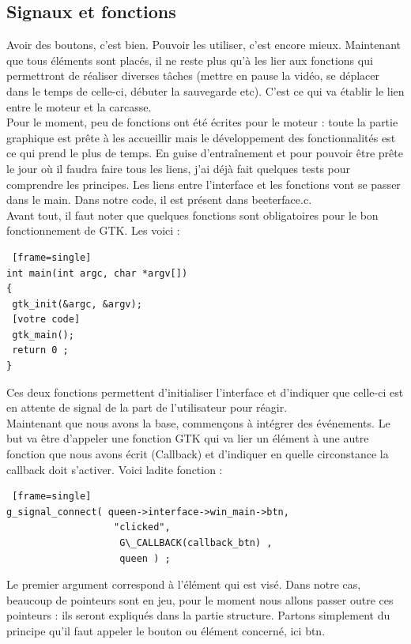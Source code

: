 \documentclass[11pt,french,a4paper]{report}
\begin{document}
        \subsection{Signaux et fonctions} 
Avoir des boutons, c'est bien. Pouvoir les utiliser, c'est encore mieux. Maintenant que tous éléments sont placés, 
il ne reste plus qu'à les lier aux fonctions qui permettront de réaliser diverses tâches (mettre en pause la vidéo,
se déplacer dans le temps de celle-ci, débuter la sauvegarde etc).    
C'est ce qui va établir le lien entre le moteur et la carcasse. \\
Pour le moment, peu de fonctions ont été écrites pour le moteur : toute la partie graphique est prête à les accueillir 
mais le développement des fonctionnalités est ce qui prend le plus de temps. En guise d'entraînement et pour 
pouvoir être prête le jour où il faudra faire tous les liens, j'ai déjà fait quelques tests pour comprendre les principes.
Les liens entre l'interface et les fonctions vont se passer dans le main. Dans notre code, il est présent dans beeterface.c.\\
Avant tout, il faut noter que quelques fonctions sont obligatoires pour le bon fonctionnement de GTK. Les voici : \\
\begin{lstlisting} [frame=single]
int main(int argc, char *argv[])     
{ 
 gtk_init(&argc, &argv); 
 [votre code] 
 gtk_main();
 return 0 ;
} 
\end{lstlisting}
Ces deux fonctions permettent d'initialiser l'interface et d'indiquer que celle-ci est en attente de signal
de la part de l'utilisateur pour réagir. \\
Maintenant que nous avons la base, commençons à intégrer des événements.
Le but va être d'appeler une fonction GTK qui va lier un élément à une autre fonction que nous avons écrit  (Callback) 
et d'indiquer en quelle circonstance la callback doit s'activer. Voici ladite fonction : 
\begin{lstlisting} [frame=single]
g_signal_connect( queen->interface->win_main->btn,
                   "clicked", 
                    G\_CALLBACK(callback_btn) ,
                    queen ) ; 
\end{lstlisting}
Le premier argument correspond à l'élément qui est visé. Dans notre cas, beaucoup de pointeurs sont en jeu,
pour le moment nous allons passer outre ces pointeurs : ils seront expliqués dans la partie structure. 
Partons simplement du principe qu'il faut appeler le bouton ou élément concerné, ici btn.  
\end{document}
